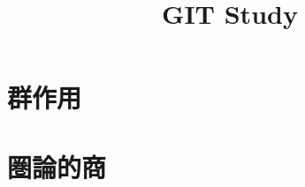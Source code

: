 \documentclass[a4j,fleqn]{jsarticle}
\title{GIT Study}
\begin{document}
  \maketitle
  \section{群作用}
  \section{圏論的商}
\end{document}

